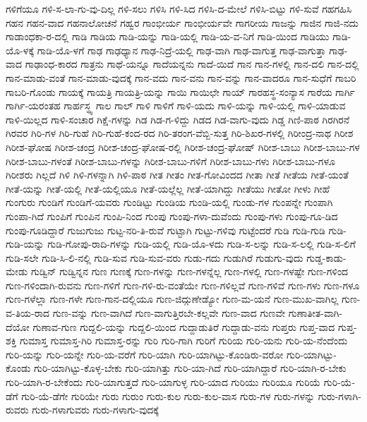 {ಗಳಿಗೆಯೂ
ಗಳಿ-ಸ-ಲಾ-ಗು-ವು-ದಿಲ್ಲ
ಗಳಿ-ಸಲು
ಗಳಿಸಿ
ಗಳಿ-ಸಿದ
ಗಳಿಸಿ-ದ-ಮೇಲೆ
ಗಳಿಸಿ-ಬಿಟ್ಟು
ಗಳಿ-ಸುವೆ
ಗಹಗಹಿಸಿ
ಗಹನ
ಗಹನ-ವಾದ
ಗಹನಾಲೋಚನೆ
ಗಹ್ವರ
ಗಾಂಭೀರ್ಯ
ಗಾಂಭೀರ್ಯವೇ
ಗಾಗರೀಯ
ಗಾಜನ್ನು
ಗಾಜಿನ
ಗಾಜಿ-ನದು
ಗಾಡಾಂಧಕಾ-ರ-ದಲ್ಲಿ
ಗಾಡಿ
ಗಾಡಿಯ
ಗಾಡಿ-ಯನ್ನು
ಗಾಡಿ-ಯಲ್ಲಿ
ಗಾಡಿ-ಯ-ವ-ನಿಗೆ
ಗಾಡಿ-ಯಿಂದ
ಗಾಡಿಯು
ಗಾಡಿ-ಯೊ-ಳಕ್ಕೆ
ಗಾಡಿ-ಯೊ-ಳಗೆ
ಗಾಢ
ಗಾಢಧ್ಯಾನ
ಗಾಢ-ನಿದ್ರೆ-ಯಲ್ಲಿ
ಗಾಢ-ವಾಗಿ
ಗಾಢ-ವಾಗುತ್ತ
ಗಾಢ-ವಾಗುತ್ತಾ
ಗಾಢ-ವಾದ
ಗಾಢಾಂಧ-ಕಾರದ
ಗಾತ್ರನು
ಗಾಥೆ-ಯನ್ನೂ
ಗಾದೆಯನ್ನನು
ಗಾದೆ-ಯಿದೆ
ಗಾನ
ಗಾನ-ಗಳಲ್ಲಿ
ಗಾನ-ದಲಿ
ಗಾನ-ದಲ್ಲಿ
ಗಾನ-ಮಾಡು-ವಂತೆ
ಗಾನ-ಮಾಡು-ವುದಕ್ಕೆ
ಗಾನ-ವದು
ಗಾನ-ವನು
ಗಾನ-ವನ್ನು
ಗಾನ-ವಾದರೂ
ಗಾನ-ಸುಧೆಗೆ
ಗಾಬರಿ
ಗಾಬರಿ-ಗೊಂಡು
ಗಾಯಕ್ಕೆ
ಗಾಯತ್ರಿ
ಗಾಯತ್ರಿ-ಯನ್ನು
ಗಾಯಿ
ಗಾಯಿಛೇ
ಗಾಯ್
ಗಾರಹಸ್ಥ-ಸಂನ್ಯಾಸ
ಗಾರೆಯ
ಗಾರ್ಗಿ
ಗಾರ್ಗಿ-ಯರಂತಹ
ಗಾರ್ಹಸ್ಥ್ಯ
ಗಾಲ
ಗಾಲ್
ಗಾಳಿ
ಗಾಳಿಗೆ
ಗಾಳಿ-ಯದು
ಗಾಳಿ-ಯನ್ನು
ಗಾಳಿ-ಯಲ್ಲಿ
ಗಾಳಿ-ಯಾಡುವ
ಗಾಳಿ-ಯಿಲ್ಲದ
ಗಾಳಿ-ಸಂಚಾರ
ಗಿಕ್ಷೆ-ಗಳನ್ನು
ಗಿಡ
ಗಿಡ-ಗ-ಳಿದ್ದು
ಗಿಡದ
ಗಿಡ-ವಾಗು-ವುದು
ಗಿಡ್ಡ
ಗಿಣಿ-ಪಾಠ
ಗಿರಗಿರನೆ
ಗಿರವರ
ಗಿರಿ-ಗಳ
ಗಿರಿ-ಗುಹೆ
ಗಿರಿ-ಗುಹೆ-ಕಂದ-ರದ
ಗಿರಿ-ತರಂಗ-ವೆಬ್ಬಿ-ಸುತ್ತ
ಗಿರಿ-ಶಿಖರ-ಗಳಲ್ಲಿ
ಗಿರೀಂದ್ರ-ನಾಥ
ಗಿರೀಶ
ಗಿರೀಶ-ಘೋಷ
ಗಿರೀಶ-ಚಂದ್ರ
ಗಿರೀಶ-ಚಂದ್ರ-ಘೋಷ-ರಲ್ಲಿ
ಗಿರೀಶ-ಚಂದ್ರ-ಘೋಷ್
ಗಿರೀಶ-ಬಾಬು
ಗಿರೀಶ-ಬಾಬು-ಗಳ
ಗಿರೀಶ-ಬಾಬು-ಗಳಂತೆ
ಗಿರೀಶ-ಬಾಬು-ಗಳನ್ನು
ಗಿರೀಶ-ಬಾಬು-ಗಳಿಗೆ
ಗಿರೀಶ-ಬಾಬು-ಗಳು
ಗಿರೀಶ-ಬಾಬು-ಗಳೂ
ಗಿರೀಶರು
ಗಿಲ್ಲದೆ
ಗಿಳಿ
ಗಿಳಿ-ಗಳನ್ನಾಗಿ
ಗಿಳಿ-ಪಾಠ
ಗೀತ
ಗೀತಂ
ಗೀತ-ಗೋವಿಂದದ
ಗೀತಾ
ಗೀತೆ
ಗೀತೆಯ
ಗೀತೆ-ಯಂತೆ
ಗೀತೆ-ಯನ್ನು
ಗೀತೆ-ಯಲ್ಲಿ
ಗೀತೆ-ಯಲ್ಲಿಯೂ
ಗೀತೆ-ಯಲ್ಲೆಲ್ಲ
ಗೀತೆ-ಯಾಗಿದ್ದು
ಗೀತೆಯು
ಗೀತೋ
ಗೀಳು
ಗೀಹೆ
ಗುಂಗುರು
ಗುಂಡಿಗೆ
ಗುಂಡಿಗೆ-ಯವರು
ಗುಂಡಿಟ್ಟು
ಗುಂಡಿಯ
ಗುಂಡಿ-ಯಲ್ಲಿ
ಗುಂಡು-ಗಳ
ಗುಂಪನ್ನೇ
ಗುಂಪಾಗಿ
ಗುಂಪಾ-ಗಿದೆ
ಗುಂಪಿಗೆ
ಗುಂಪಿನ
ಗುಂಪಿ-ನಿಂದ
ಗುಂಪು
ಗುಂಪು-ಗಳಾ-ದುವೆಂದು
ಗುಂಪು-ಗಳು
ಗುಂಪು-ಗೂ-ಡಿದ
ಗುಂಪು-ಗೂಡಿದ್ದಾರೆ
ಗುಜುಗುಜು
ಗುಟ್ಟ-ನರಿ-ತಿ-ರುವೆ
ಗುಟ್ಟಾಗಿ
ಗುಟ್ಟು-ಗಳಿವು
ಗುಟ್ಟೆಂದರೆ
ಗುಡಿ
ಗುಡಿ-ಗುಡಿ
ಗುಡಿ-ಗುಡಿ-ಯನ್ನು
ಗುಡಿ-ಗೋಪು-ರಾದಿ-ಗಳನ್ನು
ಗುಡಿ-ಯಲ್ಲಿ
ಗುಡಿ-ಯೊ-ಳದು
ಗುಡಿ-ಸ-ಲನ್ನು
ಗುಡಿ-ಸ-ಲಲ್ಲಿ
ಗುಡಿ-ಸ-ಲಿಗೆ
ಗುಡಿ-ಸಲೇ
ಗುಡಿ-ಸಿ-ಲಿ-ನಲ್ಲಿ
ಗುಡಿ-ಸುವ
ಗುಡಿ-ಸುವ-ವರು
ಗುಡು-ಗದು
ಗುಡುಗಿರೆ
ಗುಡುಗು-ವುದು
ಗುಡ್ಡ-ಕಾಡು-ಮೇಡು
ಗುಡ್ವಿನ್
ಗುಡ್ವಿನ್ನನ
ಗುಣ
ಗುಣಕ್ಕೆ
ಗುಣ-ಗಳನ್ನು
ಗುಣ-ಗಳನ್ನೆಲ್ಲ
ಗುಣ-ಗಳಲ್ಲಿ
ಗುಣ-ಗಳಷ್ಟೇ
ಗುಣ-ಗಳಿಂದ
ಗುಣ-ಗಳಿಂದಾಗಿ-ರುವನು
ಗುಣ-ಗಳಿಗೆ
ಗುಣ-ಗಳಿ-ರು-ವಂತೆಯೇ
ಗುಣ-ಗಳಿಲ್ಲವೆ
ಗುಣ-ಗಳಿವೆ
ಗುಣ-ಗಳು
ಗುಣ-ಗಳೂ
ಗುಣ-ಗಳೆಲ್ಲಾ
ಗುಣ-ಗಳೇ
ಗುಣ-ಗಾನ-ದಲ್ಲಿಯೂ
ಗುಣ-ಜಿದ್ಗುಣೇಡ್ಯೋ
ಗುಣ-ಮ-ಯನೆ
ಗುಣ-ಮುಖ-ವಾಗಿಲ್ಲ
ಗುಣ-ವ-ತಿಯ-ರಾದ
ಗುಣ-ವನ್ನು
ಗುಣ-ವಾಗಿದೆ
ಗುಣ-ವಾಗುತ್ತಿರಬೇ-ಕಲ್ಲವೇ
ಗುಣ-ವಾದ
ಗುಣವೇ
ಗುಣಾತೀತ-ವಾಗಿ-ದೆಯೋ
ಗುಣಾವ-ಗುಣ
ಗುದ್ದಲಿ-ಯನ್ನು
ಗುದ್ದಲಿ-ಯಿಂದ
ಗುದ್ದಾಡುತಿರೆ
ಗುದ್ದಾಡು-ವನು
ಗುಪ್ತರು
ಗುಪ್ತ-ವಾದ
ಗುಪ್ತ-ಶಕ್ತಿ
ಗುಮಾಸ್ತ
ಗುಮಾಸ್ತ-ಗಿರಿ
ಗುಮಾಸ್ತ-ರನ್ನು
ಗುರಿ
ಗುರಿ-ಗಾಗಿ
ಗುರಿಗೆ
ಗುರಿಯ
ಗುರಿ-ಯನು
ಗುರಿ-ಯ-ನೆಂದೆಂದು
ಗುರಿ-ಯನ್ನು
ಗುರಿ-ಯನ್ನೇ
ಗುರಿ-ಯ-ವರೆಗೆ
ಗುರಿ-ಯಾಗಿ
ಗುರಿ-ಯಾಗಿಟ್ಟು-ಕೊಂಡಿರು-ವರೋ
ಗುರಿ-ಯಾಗಿಟ್ಟು-ಕೊಂಡು
ಗುರಿ-ಯಾಗಿಟ್ಟು-ಕೊಳ್ಳ-ಬೇಕು
ಗುರಿ-ಯಾಗಿತ್ತು
ಗುರಿ-ಯಾ-ಗಿದೆ
ಗುರಿ-ಯಾಗಿದ್ದಾರೆ
ಗುರಿ-ಯಾಗಿ-ರ-ಬೇಕು
ಗುರಿ-ಯಾಗಿ-ರ-ಬೇಕೆಂದು
ಗುರಿ-ಯಾಗುತ್ತದೆ
ಗುರಿ-ಯಾಗುಳ್ಳ
ಗುರಿ-ಯಾದ
ಗುರಿಯು
ಗುರಿಯೂ
ಗುರಿಯೆ
ಗುರಿ-ಯೆ-ಡೆಗೆ
ಗುರಿ-ಯೆ-ಡೆಗೇ
ಗುರಿಯೇ
ಗುರು
ಗುರುಂ
ಗುರು-ಕುಲ
ಗುರು-ಕುಲ-ವಾಸ
ಗುರು-ಗಳ
ಗುರು-ಗಳನ್ನು
ಗುರು-ಗಳಾಗಿ-ರುವರು
ಗುರು-ಗಳಾಗುವರು
ಗುರು-ಗಳಾಗು-ವುದಕ್ಕೆ
}
